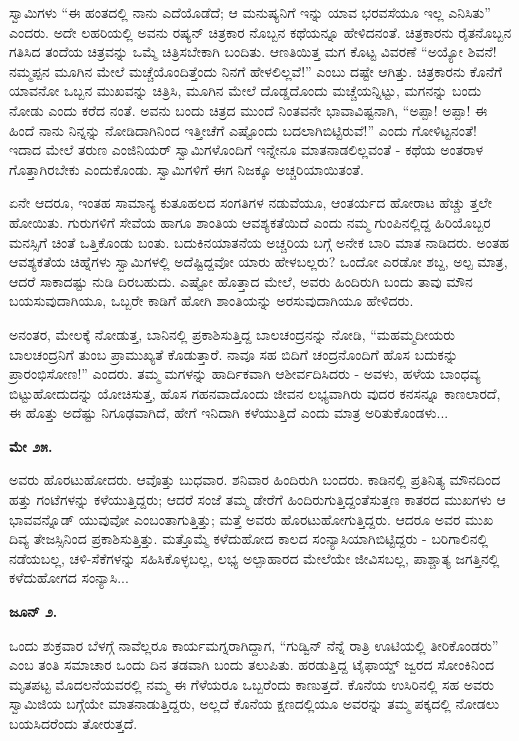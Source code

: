 ಸ್ವಾಮಿಗಳು “ಈ ಹಂತದಲ್ಲಿ ನಾನು ಎದೆಯೊಡೆದೆ; ಆ ಮನುಷ್ಯನಿಗೆ ಇನ್ನು ಯಾವ ಭರವಸೆಯೂ ಇಲ್ಲ ಎನಿಸಿತು” ಎಂದರು. ಅದೇ ಲಹರಿಯಲ್ಲಿ ಅವನು ರಷ್ಯನ್ ಚಿತ್ರಕಾರ ನೊಬ್ಬನ ಕಥೆಯನ್ನೂ ಹೇಳಿದನಂತೆ. ಚಿತ್ರಕಾರನು ರೈತನೊಬ್ಬನ ಗತಿಸಿದ ತಂದೆಯ ಚಿತ್ರವನ್ನು ಒಮ್ಮೆ ಚಿತ್ರಿಸಬೇಕಾಗಿ ಬಂದಿತು. ಆಣತಿಯಿತ್ತ ಮಗ ಕೊಟ್ಟ ವಿವರಣೆ “ಅಯ್ಯೋ ಶಿವನೆ! ನಮ್ಮಪ್ಪನ ಮೂಗಿನ ಮೇಲೆ ಮಚ್ಚೆಯೊಂದಿತ್ತೆಂದು ನಿನಗೆ ಹೇಳಲಿಲ್ಲವೆ!” ಎಂಬು ದಷ್ಟೇ ಆಗಿತ್ತು. ಚಿತ್ರಕಾರನು ಕೊನೆಗೆ ಯಾವನೋ ಒಬ್ಬನ ಮುಖವನ್ನು ಚಿತ್ರಿಸಿ, ಮೂಗಿನ ಮೇಲೆ ದೊಡ್ಡದೊಂದು ಮಚ್ಚೆಯನ್ನಿಟ್ಟು, ಮಗನನ್ನು ಬಂದು ನೋಡು ಎಂದು ಕರೆದ ನಂತೆ. ಅವನು ಬಂದು ಚಿತ್ರದ ಮುಂದೆ ನಿಂತವನೇ ಭಾವಾವಿಷ್ಟನಾಗಿ, “ಅಪ್ಪಾ! ಅಪ್ಪಾ! ಈ ಹಿಂದೆ ನಾನು ನಿನ್ನನ್ನು ನೋಡಿದಾಗಿನಿಂದ ಇತ್ತೀಚೆಗೆ ಎಷ್ಟೊಂದು ಬದಲಾಗಿಬಿಟ್ಟಿರುವೆ!” ಎಂದು ಗೋಳಿಟ್ಟನಂತೆ! ಇದಾದ ಮೇಲೆ ತರುಣ ಎಂಜಿನಿಯರ್ ಸ್ವಾಮಿಗಳೊಂದಿಗೆ ಇನ್ನೇನೂ ಮಾತನಾಡಲಿಲ್ಲವಂತೆ - ಕಥೆಯ ಅಂತರಾಳ ಗೊತ್ತಾಗಿರಬೇಕು ಎಂದುಕೊಂಡು. ಸ್ವಾಮಿಗಳಿಗೆ ಈಗ ನಿಜಕ್ಕೂ ಅಚ್ಚರಿಯಾಯಿತಂತೆ.

ಏನೇ ಆದರೂ, ಇಂತಹ ಸಾಮಾನ್ಯ ಕುತೂಹಲದ ಸಂಗತಿಗಳ ನಡುವೆಯೂ, ಆಂತರ್ಯದ ಹೋರಾಟ ಹೆಚ್ಚು ತ್ತಲೇ ಹೋಯಿತು. ಗುರುಗಳಿಗೆ ಸೇವೆಯ ಹಾಗೂ ಶಾಂತಿಯ ಆವಶ್ಯಕತೆಯಿದೆ ಎಂದು ನಮ್ಮ ಗುಂಪಿನಲ್ಲಿದ್ದ ಹಿರಿಯೊಬ್ಬರ ಮನಸ್ಸಿಗೆ ಚಿಂತೆ ಒತ್ತಿಕೊಂಡು ಬಂತು. ಬದುಕಿನಯಾತನೆಯ ಅಚ್ಚರಿಯ ಬಗ್ಗೆ ಅನೇಕ ಬಾರಿ ಮಾತ ನಾಡಿದರು. ಅಂತಹ ಆವಶ್ಯಕತೆಯ ಚಿಹ್ನೆಗಳು ಸ್ವಾಮಿಗಳಲ್ಲಿ ಅದೆಷ್ಟಿದ್ದವೋ ಯಾರು ಹೇಳಬಲ್ಲರು? ಒಂದೋ ಎರಡೋ ಶಬ್ದ, ಅಲ್ಪ ಮಾತ್ರ, ಆದರೆ ಸಾಕಾದಷ್ಟು ನುಡಿ ದಿರಬಹುದು. ಎಷ್ಟೋ ಹೊತ್ತಾದ ಮೇಲೆ, ಅವರು ಹಿಂದಿರುಗಿ ಬಂದು ತಾವು ಮೌನ ಬಯಸುವುದಾಗಿಯೂ, ಒಬ್ಬರೇ ಕಾಡಿಗೆ ಹೋಗಿ ಶಾಂತಿಯನ್ನು ಅರಸುವುದಾಗಿಯೂ ಹೇಳಿದರು.

ಅನಂತರ, ಮೇಲಕ್ಕೆ ನೋಡುತ್ತ, ಬಾನಿನಲ್ಲಿ ಪ್ರಕಾಶಿಸುತ್ತಿದ್ದ ಬಾಲಚಂದ್ರನನ್ನು ನೋಡಿ, “ಮಹಮ್ಮದೀಯರು ಬಾಲಚಂದ್ರನಿಗೆ ತುಂಬ ಪ್ರಾಮುಖ್ಯತೆ ಕೊಡುತ್ತಾರೆ. ನಾವೂ ಸಹ ಬಿದಿಗೆ ಚಂದ್ರನೊಂದಿಗೆ ಹೊಸ ಬದುಕನ್ನು ಪ್ರಾರಂಭಿಸೋಣ!” ಎಂದರು. ತಮ್ಮ ಮಗಳನ್ನು ಹಾರ್ದಿಕವಾಗಿ ಆಶೀರ್ವದಿಸಿದರು - ಅವಳು, ಹಳೆಯ ಬಾಂಧವ್ಯ ಬಿಟ್ಟುಹೋದುದನ್ನು ಯೋಚಿಸುತ್ತ, ಹೊಸ ಗಹನವಾದೊಂದು ಜೀವನ ಲಭ್ಯವಾಗಿರು ವುದರ ಕನಸನ್ನೂ ಕಾಣಲಾರದೆ, ಈ ಹೊತ್ತು ಅದೆಷ್ಟು ನಿಗೂಢವಾಗಿದೆ, ಹೇಗೆ ಇನಿದಾಗಿ ಕಳೆಯುತ್ತಿದೆ ಎಂದು ಮಾತ್ರ ಅರಿತುಕೊಂಡಳು...

\textbf{ಮೇ ೨೫.}

ಅವರು ಹೊರಟುಹೋದರು. ಆವೊತ್ತು ಬುಧವಾರ. ಶನಿವಾರ ಹಿಂದಿರುಗಿ ಬಂದರು. ಕಾಡಿನಲ್ಲಿ ಪ್ರತಿನಿತ್ಯ ಮೌನದಿಂದ ಹತ್ತು ಗಂಟೆಗಳನ್ನು ಕಳೆಯುತ್ತಿದ್ದರು; ಆದರೆ ಸಂಜೆ ತಮ್ಮ ಡೇರೆಗೆ ಹಿಂದಿರುಗುತ್ತಿದ್ದಂತೆಸುತ್ತಣ ಕಾತರದ ಮುಖಗಳು ಆ ಭಾವವನ್ನೊಡ್ ಯುವುವೋ ಎಂಬಂತಾಗುತ್ತಿತ್ತು; ಮತ್ತೆ ಅವರು ಹೊರಟುಹೋಗುತ್ತಿದ್ದರು. ಆದರೂ ಅವರ ಮುಖ ದಿವ್ಯ ತೇಜಸ್ಸಿನಿಂದ ಪ್ರಕಾಶಿಸುತ್ತಿತ್ತು. ಮತ್ತೊಮ್ಮೆ ಕಳೆದುಹೋದ ಕಾಲದ ಸಂನ್ಯಾಸಿಯಾಗಿಬಿಟ್ಟಿದ್ದರು - ಬರಿಗಾಲಿನಲ್ಲಿ ನಡೆಯಬಲ್ಲ, ಚಳಿ-ಸೆಕೆಗಳನ್ನು ಸಹಿಸಿಕೊಳ್ಳಬಲ್ಲ, ಲಭ್ಯ ಅಲ್ಪಾಹಾರದ ಮೇಲೆಯೇ ಜೀವಿಸಬಲ್ಲ, ಪಾಶ್ಚಾತ್ಯ ಜಗತ್ತಿನಲ್ಲಿ ಕಳೆದುಹೋಗದ ಸಂನ್ಯಾಸಿ...

\textbf{ಜೂನ್ ೨.}

ಒಂದು ಶುಕ್ರವಾರ ಬೆಳಗ್ಗೆ ನಾವೆಲ್ಲರೂ ಕಾರ್ಯಮಗ್ನರಾಗಿದ್ದಾಗ, “ಗುಡ್ವಿನ್ ನೆನ್ನೆ ರಾತ್ರಿ ಊಟಿಯಲ್ಲಿ ತೀರಿಕೊಂಡರು” ಎಂಬ ತಂತಿ ಸಮಾಚಾರ ಒಂದು ದಿನ ತಡವಾಗಿ ಬಂದು ತಲುಪಿತು. ಹರಡುತ್ತಿದ್ದ ಟೈಫಾಯ್ಡ್ ಜ್ವರದ ಸೋಂಕಿನಿಂದ ಮೃತಪಟ್ಟ ಮೊದಲನೆಯವರಲ್ಲಿ ನಮ್ಮ ಈ ಗೆಳೆಯರೂ ಒಬ್ಬರೆಂದು ಕಾಣುತ್ತದೆ. ಕೊನೆಯ ಉಸಿರಿನಲ್ಲಿ ಸಹ ಅವರು ಸ್ವಾಮಿಜಿಯ ಬಗ್ಗೆಯೇ ಮಾತನಾಡುತ್ತಿದ್ದರು, ಅಲ್ಲದೆ ಕೊನೆಯ ಕ್ಷಣದಲ್ಲಿಯೂ ಅವರನ್ನು ತಮ್ಮ ಪಕ್ಕದಲ್ಲಿ ನೋಡಲು ಬಯಸಿದರೆಂದು ತೋರುತ್ತದೆ.

